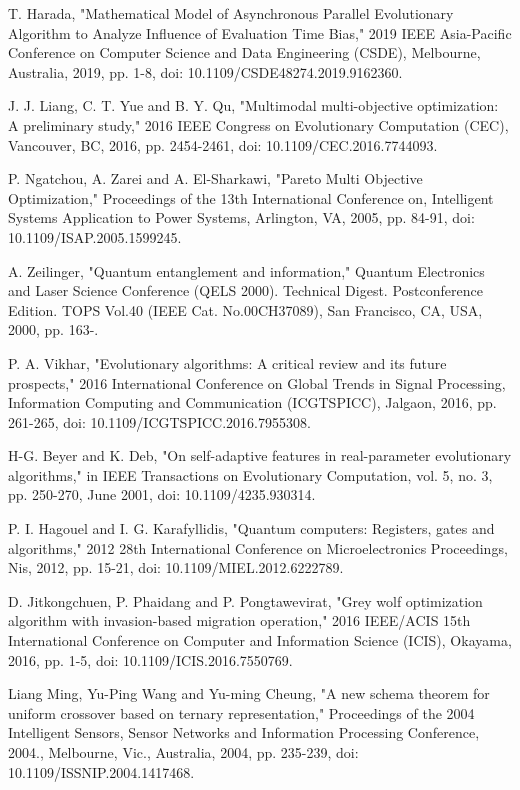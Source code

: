 \documentclass[conference]{IEEEtran}
\begin{document}
\begin{thebibliography}{00}

T. Harada, "Mathematical Model of Asynchronous Parallel Evolutionary Algorithm to Analyze Influence of Evaluation Time Bias," 2019 IEEE Asia-Pacific Conference on Computer Science and Data Engineering (CSDE), Melbourne, Australia, 2019, pp. 1-8, doi: 10.1109/CSDE48274.2019.9162360.

 J. J. Liang, C. T. Yue and B. Y. Qu, "Multimodal multi-objective optimization: A preliminary study," 2016 IEEE Congress on Evolutionary Computation (CEC), Vancouver, BC, 2016, pp. 2454-2461, doi: 10.1109/CEC.2016.7744093.

 P. Ngatchou, A. Zarei and A. El-Sharkawi, "Pareto Multi Objective Optimization," Proceedings of the 13th International Conference on, Intelligent Systems Application to Power Systems, Arlington, VA, 2005, pp. 84-91, doi: 10.1109/ISAP.2005.1599245.

 A. Zeilinger, "Quantum entanglement and information," Quantum Electronics and Laser Science Conference (QELS 2000). Technical Digest. Postconference Edition. TOPS Vol.40 (IEEE Cat. No.00CH37089), San Francisco, CA, USA, 2000, pp. 163-.

 P. A. Vikhar, "Evolutionary algorithms: A critical review and its future prospects," 2016 International Conference on Global Trends in Signal Processing, Information Computing and Communication (ICGTSPICC), Jalgaon, 2016, pp. 261-265, doi: 10.1109/ICGTSPICC.2016.7955308.

 H-G. Beyer and K. Deb, "On self-adaptive features in real-parameter evolutionary algorithms," in IEEE Transactions on Evolutionary Computation, vol. 5, no. 3, pp. 250-270, June 2001, doi: 10.1109/4235.930314.

 P. I. Hagouel and I. G. Karafyllidis, "Quantum computers: Registers, gates and algorithms," 2012 28th International Conference on Microelectronics Proceedings, Nis, 2012, pp. 15-21, doi: 10.1109/MIEL.2012.6222789.

 D. Jitkongchuen, P. Phaidang and P. Pongtawevirat, "Grey wolf optimization algorithm with invasion-based migration operation," 2016 IEEE/ACIS 15th International Conference on Computer and Information Science (ICIS), Okayama, 2016, pp. 1-5, doi: 10.1109/ICIS.2016.7550769.

 Liang Ming, Yu-Ping Wang and Yu-ming Cheung, "A new schema theorem for uniform crossover based on ternary representation," Proceedings of the 2004 Intelligent Sensors, Sensor Networks and Information Processing Conference, 2004., Melbourne, Vic., Australia, 2004, pp. 235-239, doi: 10.1109/ISSNIP.2004.1417468.


\end{thebibliography}
\end{document}
